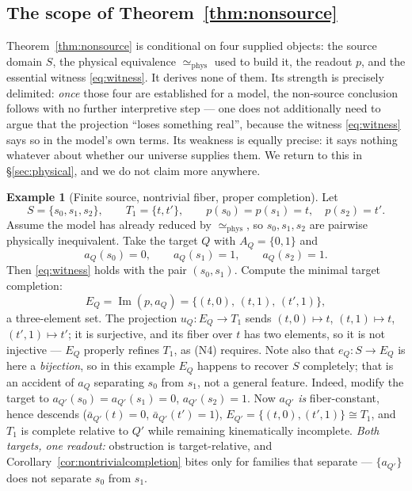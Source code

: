 \documentclass[11pt,reqno]{amsart}
\theoremstyle{plain}
\theoremstyle{definition}
\newtheorem{example}[theorem]{Example}
\theoremstyle{remark}
\DeclareMathOperator{\Ima}{Im}
\begin{document}
\subsection{The scope of Theorem~\ref{thm:nonsource}}

Theorem~\ref{thm:nonsource} is conditional on four supplied objects: the source domain $S$, the physical equivalence $\simeq_{\mathrm{phys}}$ used to build it, the readout $p$, and the essential witness \eqref{eq:witness}. It derives none of them. Its strength is precisely delimited: \emph{once} those four are established for a model, the non-source conclusion follows with no further interpretive step --- one does not additionally need to argue that the projection ``loses something real'', because the witness \eqref{eq:witness} says so in the model's own terms. Its weakness is equally precise: it says nothing whatever about whether our universe supplies them. We return to this in \S\ref{sec:physical}, and we do not claim more anywhere.

\begin{example}[Finite source, nontrivial fiber, proper completion]\label{ex:finite}
Let
\[
S=\{s_0,s_1,s_2\},\qquad T_1=\{t,t'\},\qquad p(s_0)=p(s_1)=t,\quad p(s_2)=t'.
\]
Assume the model has already reduced by $\simeq_{\mathrm{phys}}$, so $s_0,s_1,s_2$ are pairwise physically inequivalent. Take the target $Q$ with $A_Q=\{0,1\}$ and
\[
a_Q(s_0)=0,\qquad a_Q(s_1)=1,\qquad a_Q(s_2)=1 .
\]
Then \eqref{eq:witness} holds with the pair $(s_0,s_1)$. Compute the minimal target completion:
\[
E_Q=\Ima(p,a_Q)=\bigl\{(t,0),\,(t,1),\,(t',1)\bigr\},
\]
a three-element set. The projection $u_Q\colon E_Q\to T_1$ sends $(t,0)\mapsto t$, $(t,1)\mapsto t$, $(t',1)\mapsto t'$; it is surjective, and its fiber over $t$ has two elements, so it is not injective --- $E_Q$ properly refines $T_1$, as (N4) requires. Note also that $e_Q\colon S\to E_Q$ is here a \emph{bijection}, so in this example $E_Q$ happens to recover $S$ completely; that is an accident of $a_Q$ separating $s_0$ from $s_1$, not a general feature. Indeed, modify the target to $a_{Q'}(s_0)=a_{Q'}(s_1)=0$, $a_{Q'}(s_2)=1$. Now $a_{Q'}$ \emph{is} fiber-constant, hence descends ($\bar a_{Q'}(t)=0$, $\bar a_{Q'}(t')=1$), $E_{Q'}=\{(t,0),(t',1)\}\cong T_1$, and $T_1$ is complete relative to $Q'$ while remaining kinematically incomplete. \emph{Both targets, one readout:} obstruction is target-relative, and Corollary~\ref{cor:nontrivialcompletion} bites only for families that separate --- $\{a_{Q'}\}$ does not separate $s_0$ from $s_1$.
\end{example}
\end{document}
